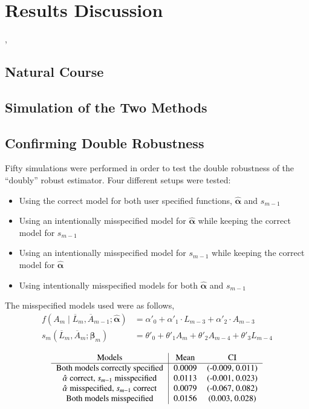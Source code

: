 
\chapter{Results Discussion}

, 

\section{Natural Course} 

\section{Simulation of the Two Methods} 



\section{Confirming Double Robustness} 
Fifty simulations were performed in order to test the double robustness of the ``doubly'' robust estimator.  Four different setups were tested: 
\begin{itemize} 
\item Using the correct model for both user specified functions, $\hat{\mathbf{\alpha}}$ and $s_{m-1}$ 
\item Using an intentionally misspecified model for $\hat{\mathbf{\alpha}}$ while keeping the correct model for $s_{m-1}$ 
\item Using an intentionally misspecified model for $s_{m-1}$ while keeping the correct model for $\hat{\mathbf{\alpha}}$
\item Using intentionally misspecified models for both $\hat{\mathbf{\alpha}}$ and $s_{m-1}$ 
\end{itemize} 

The misspecified models used were as follows, 
\begin{align} 
f(A_m \mid \overline{L}_m, \overline{A}_{m-1}; \hat{\mathbf{\alpha}}) &= \alpha'_{0} + \alpha'_{1} \cdot L_{m-3} + \alpha'_{2} \cdot A_{m-3} \\ 
s_{m}(\overline{L}_{m}, \overline{A}_{m};\mathbf{\beta}_{m}) &= \theta'_0 + \theta'_1 A_{m} +\theta'_2 A_{m-4} + \theta'_3 L_{m-4} 
 \end{align} 

\begin{align} 
\begin{tabular} {c | c  c}
Models & Mean & CI \\ 
\hline  
Both models correctly specified & 0.0009 & (-0.009, 0.011)\\ 
$\hat{\mathbf{\alpha}}$ correct, $s_{m-1}$ misspecified & 0.0113 & (-0.001, 0.023)\\ 
$\hat{\mathbf{\alpha}}$ misspecified, $s_{m-1}$ correct & 0.0079 & (-0.067, 0.082) \\
Both models misspecified & 0.0156 & (0.003, 0.028) 
\end{tabular}
\end{align} 